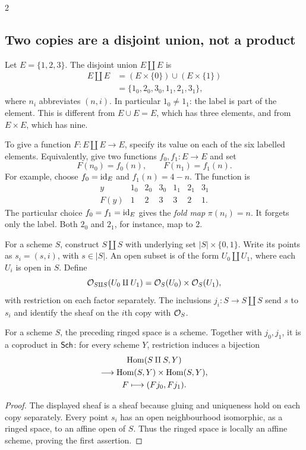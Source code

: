 \documentclass[12pt]{memoir}
\begin{document}
\begin{multicols}{2}
\subsection{Two copies are a disjoint union, not a product}
\begin{Ex}\label{ex:labelledset}
Let $E=\{1,2,3\}$. The disjoint union $E\amalg E$ is
\[
\begin{aligned}
E\amalg E&=(E\times\{0\})\cup(E\times\{1\})\\
 &=\{1_0,2_0,3_0,1_1,2_1,3_1\},
\end{aligned}
\]
where $n_i$ abbreviates $(n,i)$. In particular $1_0\ne1_1$: the label
is part of the element. This is different from $E\cup E=E$, which
has three elements, and from $E\times E$, which has nine.

To give a function $F:E\amalg E\to E$, specify its value on each
of the six labelled elements. Equivalently, give two functions
$f_0,f_1:E\to E$ and set
\[
 F(n_0)=f_0(n),\qquad F(n_1)=f_1(n).
\]
For example, choose $f_0=\operatorname{id}_E$ and $f_1(n)=4-n$. The function is
\[
\begin{array}{c|rrrrrr}
y&1_0&2_0&3_0&1_1&2_1&3_1\\\hline
F(y)&1&2&3&3&2&1.
\end{array}
\]
The particular choice $f_0=f_1=\operatorname{id}_E$ gives the \emph{fold map}
$\pi(n_i)=n$. It forgets only the label. Both $2_0$ and $2_1$, for
instance, map to $2$.
\end{Ex}

\begin{Def}
For a scheme $S$, construct $S\amalg S$ with underlying set
$|S|\times\{0,1\}$. Write its points as $s_i=(s,i)$, with $s\in|S|$.
An open subset is of the form $U_0\amalg U_1$, where each $U_i$ is
open in $S$. Define
\[
 \mathcal{O}_{S\amalg S}(U_0\amalg U_1)
 =\mathcal{O}_S(U_0)\times\mathcal{O}_S(U_1),
\]
with restriction on each factor separately. The inclusions
$j_i:S\to S\amalg S$ send $s$ to $s_i$ and identify the sheaf on
the $i$th copy with $\mathcal{O}_S$.
\end{Def}

\begin{Prop}
For a scheme $S$, the preceding ringed space is a scheme. Together
with $j_0,j_1$, it is a coproduct in $\mathsf{Sch}$: for every scheme $Y$,
restriction induces a bijection
\[
\begin{gathered}
\operatorname{Hom}(S\amalg S,Y)\\
\longrightarrow\operatorname{Hom}(S,Y)\times\operatorname{Hom}(S,Y),\\
F\longmapsto(Fj_0,Fj_1).
\end{gathered}
\]
\end{Prop}
\begin{proof}
The displayed sheaf is a sheaf because gluing and uniqueness hold on
each copy separately. Every point $s_i$ has an open neighbourhood
isomorphic, as a ringed space, to an affine open of $S$. Thus the
ringed space is locally an affine scheme, proving the first assertion.


\end{proof}
\end{multicols}
\end{document}
